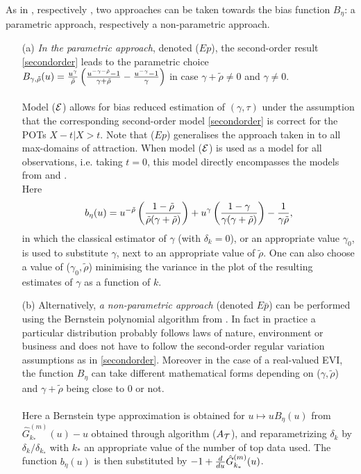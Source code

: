 \begin{enumerate}
\noindent
As in \cite{naveau2016modeling}, respectively \cite{tencaliec2018flexible}, two approaches can be taken towards the bias function $B_{\eta}$: a parametric approach, respectively a non-parametric approach. 
\begin{itemize}
\item[(a)] {\it In the parametric approach}, denoted ($Ep$), the second-order result \eqref{secondorder} leads to the parametric choice $B_{\gamma,\tilde{\rho}}(u)= {u^{\gamma} \over \tilde\rho}\left({u^{-\gamma -\tilde{\rho}}-1 \over \gamma +\tilde\rho}- {u^{-\gamma}-1 \over \gamma}\right)$ in case $\gamma+\tilde\rho \neq 0$ and $\gamma \neq 0$. \\\\
Model (${\cal{E}}$) allows for bias reduced estimation of $(\gamma,\tau)$ under the assumption that the corresponding second-order model \eqref{secondorder} is correct for the POTs $X-t|X>t$. Note that ($Ep$) generalises the approach taken in \cite{beirlant2009second} to all max-domains of attraction. When model (${\cal E}$) is used as a model for all observations, i.e. taking $t=0$, this model directly encompasses the models from \cite{frigessi2002dynamic} and \cite{naveau2016modeling}.\\
Here
\[b_\eta (u)= u^{-\tilde\rho}\left( {1-\tilde\rho\over \tilde\rho (\gamma +\tilde\rho)}\right)
+ u^\gamma \left( {1-\gamma \over \gamma (\gamma +\tilde\rho)}\right)
- {1 \over \gamma\tilde\rho},
\]
in which the classical estimator of $\gamma$ (with $\delta_k=0$), or an appropriate value $\gamma_0$, is used to substitute $\gamma$, next to an appropriate value of $\tilde\rho$. One can also choose a value of ($\gamma_0,\tilde\rho$) minimising the variance in the plot of the resulting estimates of $\gamma$ as a function of $k$.
 
\item[(b)] Alternatively, {\it a non-parametric approach} (denoted $E{\bar{p}}$) can be performed using the Bernstein polynomial algorithm from \cite{tencaliec2018flexible}. In fact in practice a particular distribution probably follows laws of nature, environment or business and does not have to follow the second-order regular variation assumptions as in \eqref{secondorder}. Moreover in the case of a real-valued EVI, the function $B_{\eta}$ can take different mathematical forms depending on ($\gamma,\tilde\rho$) and $\gamma+\tilde\rho$ being close to 0 or not.\\\\
Here a Bernstein type approximation is obtained for $u\mapsto uB_\eta (u)$ from
$\hat{G}_{k_*}^{(m)}(u) -u$ obtained through algorithm ($A_{\cal T}$), and reparametrizing $\delta_k$ by $\delta_k/\delta_{k_*}$ with $k_*$ an appropriate value of the number of top data used.
The function $b_\eta (u)$ is then substituted by
$-1 + {d \over du}\hat{G}_{k_*}^{(m)}(u)$.
 \end{itemize}
 
\end{enumerate}
 
